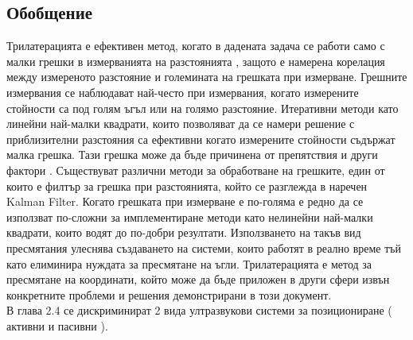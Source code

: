 \subsection{Обобщение}

Трилатерацията е ефективен метод, когато в дадената задача се работи само с малки грешки в измерванията на разстоянията \cite{trilat}, защото е намерена корелация между измереното разстояние и големината на грешката при измерване. Грешните измервания се наблюдават най-често при измервания, когато измерените стойности са под голям ъгъл или на голямо разстояние. Итеративни методи като линейни най-малки квадрати, които позволяват да се намери решение с приблизителни разстояния са ефективни когато измерените стойности съдържат малка грешка. Тази грешка може да бъде причинена от препятствия и други фактори \cite{yonei}. Съществуват различни методи за обработване на грешките, един от които е филтър за грешка при разстоянията, който се разглежда в \cite{yonei} наречен Kalman Filter. Когато грешката при измерване е по-голяма е редно да се използват по-сложни за имплементиране методи като нелинейни най-малки квадрати, които водят до по-добри резултати. Използването на такъв вид пресмятания улеснява създаването на системи, които работят в реално време тъй като елиминира нуждата за пресмятане на ъгли. Трилатерацията е метод за пресмятане на координати, който може да бъде приложен в други сфери извън конкретните проблеми и решения демонстрирани в този документ. \\В глава 2.4 се дискриминират 2 вида ултразвукови системи за позициониране ( активни и пасивни ).